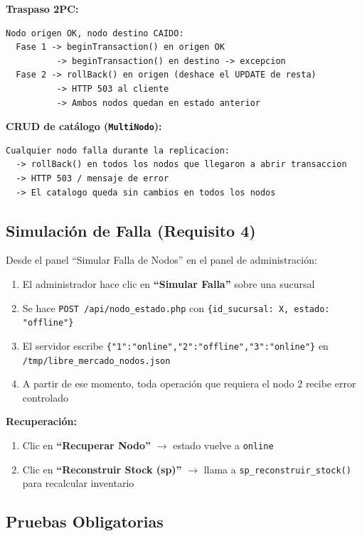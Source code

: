 \documentclass[11pt,a4paper]{article}
\newcommand{\code}[1]{\texttt{#1}}
\begin{document}
\textbf{Traspaso 2PC:}
\begin{lstlisting}
Nodo origen OK, nodo destino CAIDO:
  Fase 1 -> beginTransaction() en origen OK
          -> beginTransaction() en destino -> excepcion
  Fase 2 -> rollBack() en origen (deshace el UPDATE de resta)
          -> HTTP 503 al cliente
          -> Ambos nodos quedan en estado anterior
\end{lstlisting}

\textbf{CRUD de catálogo (\code{MultiNodo}):}
\begin{lstlisting}
Cualquier nodo falla durante la replicacion:
  -> rollBack() en todos los nodos que llegaron a abrir transaccion
  -> HTTP 503 / mensaje de error
  -> El catalogo queda sin cambios en todos los nodos
\end{lstlisting}

\subsection{Simulación de Falla (Requisito 4)}

Desde el panel ``Simular Falla de Nodos'' en el panel de administración:

\begin{enumerate}[nosep]
    \item El administrador hace clic en \textbf{``Simular Falla''} sobre una sucursal
    \item Se hace \code{POST /api/nodo\_estado.php} con \code{\{id\_sucursal: X, estado: "offline"\}}
    \item El servidor escribe \code{\{"1":"online","2":"offline","3":"online"\}} en \code{/tmp/libre\_mercado\_nodos.json}
    \item A partir de ese momento, toda operación que requiera el nodo 2 recibe error controlado
\end{enumerate}

\textbf{Recuperación:}
\begin{enumerate}[nosep]
    \item Clic en \textbf{``Recuperar Nodo''} $\rightarrow$ estado vuelve a \code{online}
    \item Clic en \textbf{``Reconstruir Stock (sp)''} $\rightarrow$ llama a \code{sp\_reconstruir\_stock()} para recalcular inventario
\end{enumerate}

\subsection{Pruebas Obligatorias}
\end{document}
